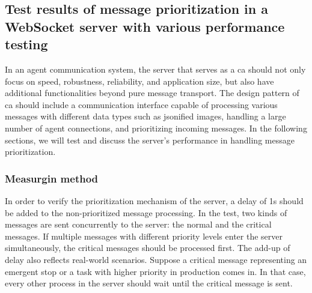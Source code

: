 \subsection{Test results of message prioritization in a WebSocket server with various 
performance testing} \label{chap: Result-priority}
In an agent communication system, the server that serves as a \gls{ca} should not only 
focus on speed, robustness, reliability, and application size, but also have additional 
functionalities beyond pure message transport. The design pattern of \gls{ca} should 
include a communication interface 
capable of processing various messages with different data types such as jsonified images, 
handling a large number of agent connections, and prioritizing incoming messages. 
In the following sections, we will test and discuss the server's performance in 
handling message prioritization.

\subsubsection{Measurgin method}
In order to verify the prioritization mechanism of the server, a delay of 1s should be 
added to the non-prioritized message processing. In the test, two kinds of messages are 
sent concurrently to the server: the normal and the critical messages. If multiple 
messages with different priority levels enter the server simultaneously, the critical 
messages should be processed first. The add-up of delay also reflects real-world scenarios. 
Suppose a critical message representing an emergent stop or a task with higher priority 
in production comes in. In that case, every other process in the server should wait until 
the critical message is sent. 

